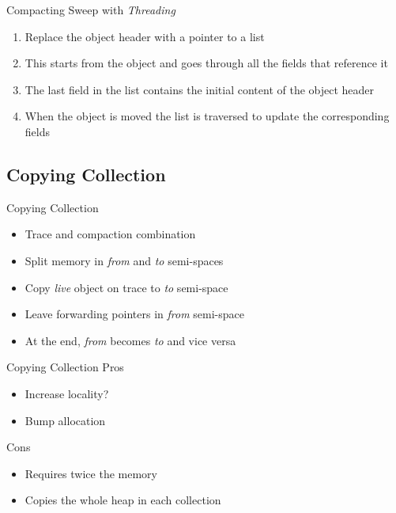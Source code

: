 \documentclass[
14pt,
aspectratio=169,
usenames,
dvipsnames,
x11names]{beamer}
\newcommand{\tik}[0]{{\color{YellowGreen}\Checkmark}} %
\newcommand{\ex}[0]{{\color{BrickRed}\XSolidBrush}}  %
\begin{document}
\begin{frame}{Compacting Sweep with \textit{Threading}}
  \begin{enumerate}  \setlength{\itemsep}{\fill}
  \item Replace the object header with a pointer to a list
  \item This starts from the object and goes through all the fields that reference it
  \item The last field in the list contains the initial content of the object header
  \item When the object is moved the list is traversed to update the corresponding fields
  \end{enumerate}
\end{frame}

\subsection{Copying Collection}

\begin{frame}{Copying Collection}
  \begin{itemize}  \setlength{\itemsep}{\fill}
  \item \alert{Trace and compaction} combination
  \item \alert{Split memory} in \textit{from} and \textit{to} semi-spaces
  \item \alert{Copy} \textit{live} object on trace to \textit{to} semi-space
  \item \alert{Leave} forwarding pointers in \textit{from} semi-space
  \item At the end, \textit{from} becomes \textit{to} and vice versa
  \end{itemize}
\end{frame}

\begin{frame}{Copying Collection}
  Pros \tik
  \begin{itemize}  \setlength{\itemsep}{\fill}
  \item \alert{Increase locality?}
  \item \alert{Bump} allocation
  \end{itemize}

  \pause

  Cons \ex
  \begin{itemize}  \setlength{\itemsep}{\fill}
  \item Requires \alert{twice the memory}
  \item \alert{Copies the whole heap} in each collection
  \end{itemize}
\end{frame}
\end{document}
